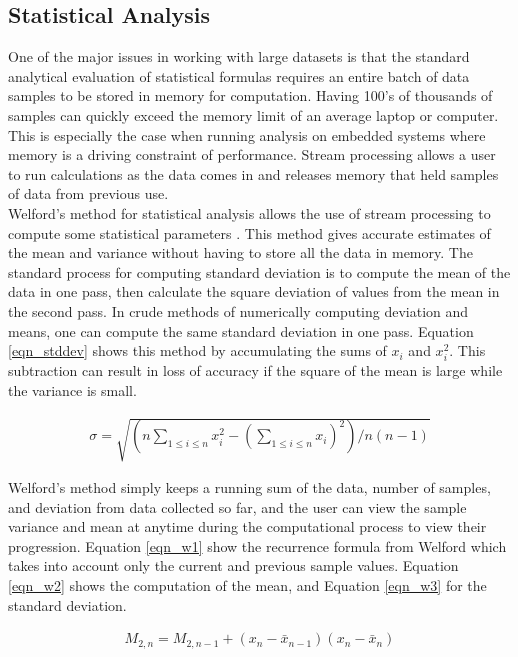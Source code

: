 \documentclass[11pt,sigconf]{acmart}
\begin{document}
\subsection{Statistical Analysis}
One of the major issues in working with large datasets is that the standard analytical
evaluation of statistical formulas requires an entire batch of data samples to
be stored in memory for computation. Having 100's of thousands of samples can
quickly exceed the memory limit of an average laptop or computer. This is especially
the case when running analysis on embedded systems where memory is a driving constraint
of performance. Stream processing allows a user to run calculations as the data comes in
and releases memory that held samples of data from previous use.
\\
Welford's method for statistical analysis allows the use of stream processing to
compute some statistical parameters \cite{welford}. This method gives accurate estimates of the 
mean and variance without having to store all the data in memory. The standard process for computing
standard deviation is to compute the mean of the data in one pass, then calculate the square
deviation of values from the mean in the second pass. In crude methods of numerically computing
deviation and means, one can compute the same standard deviation in one pass. Equation \ref{eqn_stddev} shows
this method by accumulating the sums of $x_i$ and $x_{i}^{2}$. This subtraction can result in 
loss of accuracy if the square of the mean is large while the variance is small.

\begin{equation} \label{eqn_stddev}
  \begin{split}
    \sigma =\sqrt{(n\sum_{1\leq i\leq n}x_{i}^{2}-(\sum_{1\leq i\leq n} x_{i})^2)/n(n-1)}
  \end{split}
\end{equation}

Welford's method simply keeps a running sum of the data, number of samples, 
and deviation from data collected so far, and the user can view the sample variance and
mean at anytime during the computational process to view their progression. Equation \ref{eqn_w1} show
the recurrence formula from Welford which takes into account only the current and previous sample values.
Equation \ref{eqn_w2} shows the computation of the mean, and Equation \ref{eqn_w3} for the standard deviation. 

\begin{equation} \label{eqn_w1}
  \begin{split}
    M_{2,n}=M_{2,n-1}+(x_n -\bar{x}_{n-1})(x_n -\bar{x}_{n})
  \end{split}
\end{equation}
\end{document}
